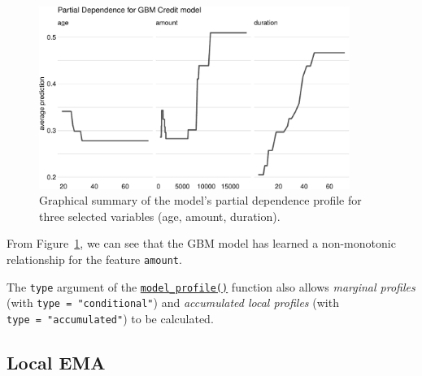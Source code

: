 \begin{figure}

{\centering \includegraphics[width=0.9\textwidth,height=\textheight]{chapters/chapter12/model_interpretation_files/figure-pdf/fig-dalex-pdp-1.pdf}

}

\caption{\label{fig-dalex-pdp}Graphical summary of the model's partial
dependence profile for three selected variables (age, amount,
duration).}

\end{figure}

From Figure~\ref{fig-dalex-pdp}, we can see that the GBM model has
learned a non-monotonic relationship for the feature \texttt{amount}.

\begin{tcolorbox}[enhanced jigsaw, opacitybacktitle=0.6, rightrule=.15mm, opacityback=0, arc=.35mm, breakable, titlerule=0mm, colframe=quarto-callout-tip-color-frame, coltitle=black, bottomrule=.15mm, toprule=.15mm, colback=white, colbacktitle=quarto-callout-tip-color!10!white, bottomtitle=1mm, toptitle=1mm, title=\textcolor{quarto-callout-tip-color}{\faLightbulb}\hspace{0.5em}{Marginal and Accumulated Local Profiles}, leftrule=.75mm, left=2mm]

The \texttt{type} argument of the
\href{https://www.rdocumentation.org/packages/DALEX/topics/model_profile}{\texttt{model\_profile()}}
function also allows \emph{marginal profiles} (with
\texttt{type\ =\ "conditional"}) and \emph{accumulated local profiles}
(with \texttt{type\ =\ "accumulated"}) to be calculated.

\end{tcolorbox}

\hypertarget{sec-interpretability-instance-level}{%
\subsection{Local EMA}\label{sec-interpretability-instance-level}}

